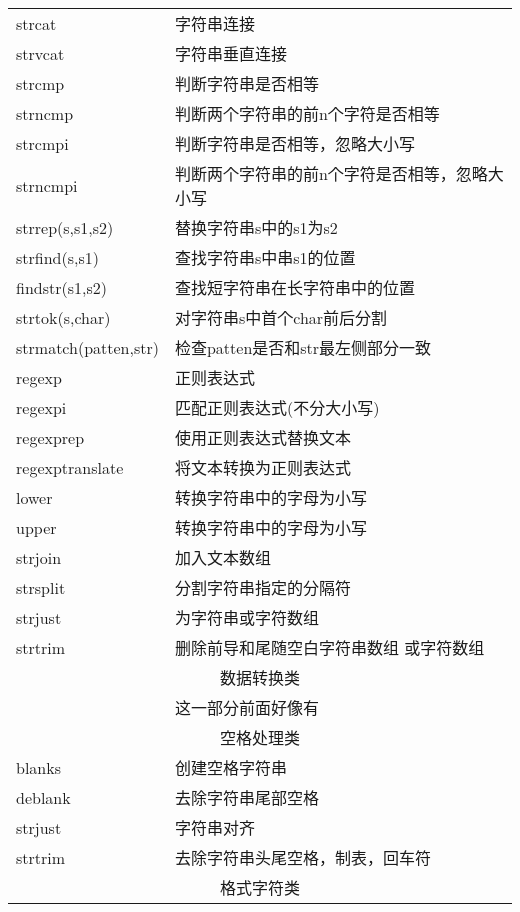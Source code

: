 \begin{longtable}{|l|l|}
            \hline
            strcat & 字符串连接\\
            strvcat &字符串垂直连接\\
            strcmp & 判断字符串是否相等\\
            strncmp &判断两个字符串的前n个字符是否相等\\
            strcmpi &判断字符串是否相等，忽略大小写\\
            strncmpi & 判断两个字符串的前n个字符是否相等，忽略大小写\\
            strrep(s,s1,s2) &替换字符串s中的s1为s2\\
            strfind(s,s1) &查找字符串s中串s1的位置\\
            findstr(s1,s2) & 查找短字符串在长字符串中的位置\\
            strtok(s,char) & 对字符串s中首个char前后分割\\
            strmatch(patten,str)&  检查patten是否和str最左侧部分一致\\
            regexp & 正则表达式\\
            regexpi &匹配正则表达式(不分大小写)\\
            regexprep &使用正则表达式替换文本\\
            regexptranslate &将文本转换为正则表达式\\
            lower &转换字符串中的字母为小写\\
            upper &转换字符串中的字母为小写\\
            strjoin &加入文本数组\\
            strsplit & 分割字符串指定的分隔符\\
            strjust &为字符串或字符数组\\
            strtrim &删除前导和尾随空白字符串数组 或字符数组\\
            \hline
            \multicolumn{2}{|c|}{数据转换类}\\
            \hline
            {}&这一部分前面好像有\\
            \hline
            \multicolumn{2}{|c|}{空格处理类}\\
            \hline
            blanks & 创建空格字符串\\
            deblank &去除字符串尾部空格\\
            strjust &字符串对齐 \\
            strtrim &去除字符串头尾空格，制表，回车符\\
            \hline
            \multicolumn{2}{|c|}{格式字符类}\\

\end{longtable}
